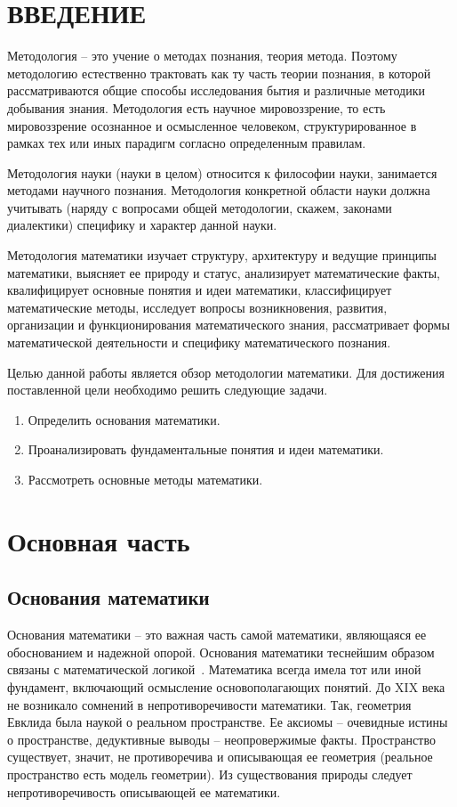 \chapter*{ВВЕДЕНИЕ}

Методология – это учение о методах познания, теория метода. Поэтому методологию естественно трактовать как ту часть теории познания, в которой рассматриваются общие способы исследования бытия и различные методики добывания знания. Методология есть научное мировоззрение, то есть мировоззрение осознанное и осмысленное человеком, структурированное в рамках тех или иных парадигм согласно определенным правилам.

Методология науки (науки в целом) относится к философии науки, занимается методами научного познания. Методология конкретной области науки должна учитывать (наряду с вопросами общей методологии, скажем, законами диалектики) специфику и характер данной науки.

Методология математики изучает структуру, архитектуру и ведущие принципы математики, выясняет ее природу и статус, анализирует математические факты, квалифицирует основные понятия и идеи математики, классифицирует математические методы, исследует вопросы возникновения, развития, организации и функционирования математического знания, рассматривает формы математической деятельности и специфику математического познания.

Целью данной работы является обзор методологии математики. Для достижения поставленной цели необходимо решить следующие задачи.

\begin{enumerate}
	\item Определить основания математики.
	\item Проанализировать фундаментальные понятия и идеи математики.
	\item Рассмотреть основные методы математики.
\end{enumerate}

\chapter{Основная часть}

\section{Основания математики}

Основания математики – это важная часть самой математики, являющаяся ее обоснованием и надежной опорой. Основания математики теснейшим образом связаны с математической логикой~\cite{перминов2001философия}. Математика всегда имела тот или иной фундамент, включающий осмысление основополагающих понятий. До XIX века не возникало сомнений в непротиворечивости математики. Так, геометрия Евклида была наукой о реальном пространстве. Ее аксиомы – очевидные истины о пространстве, дедуктивные выводы – неопровержимые факты. Пространство существует, значит, не противоречива и описывающая ее геометрия (реальное пространство есть модель геометрии). Из существования природы следует непротиворечивость описывающей ее математики.

